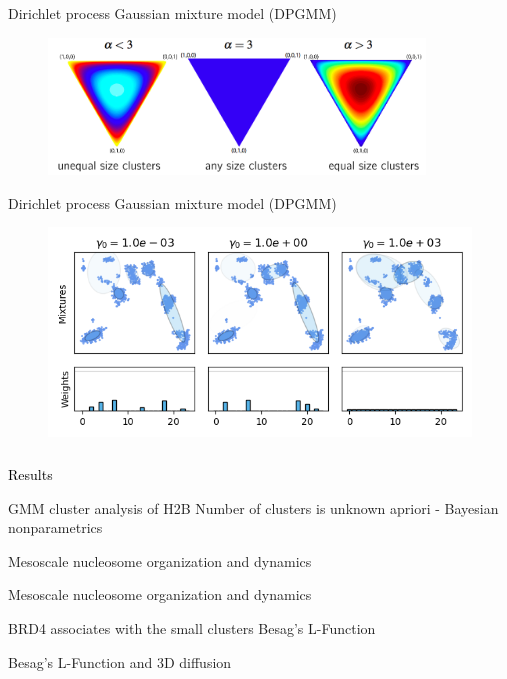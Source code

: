 \documentclass{beamer}					%
\begin{document}
\begin{frame}{Dirichlet process Gaussian mixture model (DPGMM)}
\begin{figure}
\includegraphics[width=10cm]{Dirichlet.png}
\end{figure}
\end{frame}

\begin{frame}{Dirichlet process Gaussian mixture model (DPGMM)}
\begin{figure}
\includegraphics[width=13cm]{GMM.png}
\end{figure}
\end{frame}

\begin{frame}
\frametitle{}
\centering
\Large \textcolor{black}{Results}
\end{frame}


\begin{frame}{GMM cluster analysis of H2B}
Number of clusters is unknown apriori - Bayesian nonparametrics
\end{frame}

\begin{frame}{Mesoscale nucleosome organization and dynamics}
\end{frame}

\begin{frame}{Mesoscale nucleosome organization and dynamics}
\end{frame}

\begin{frame}{BRD4 associates with the small clusters}
Besag's L-Function
\end{frame}

\begin{frame}{Besag's L-Function and 3D diffusion}
\end{frame}
\end{document}
